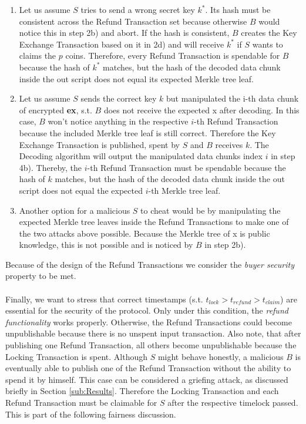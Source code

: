 \documentclass{cacthesis}
\newcounter{protocol}
\begin{document}
        \begin{enumerate}
            \item Let us assume $S$ tries to send a wrong secret key $k^*$. Its hash must be consistent across the Refund Transaction set because otherwise $B$ would notice this in step 2b) and abort. If the hash is consistent, $B$ creates the Key Exchange Transaction based on it in 2d) and will receive $k^*$ if $S$ wants to claims the $p$ coins. Therefore, every Refund Transaction is spendable for $B$ because the hash of $k^*$ matches, but the hash of the decoded data chunk inside the out script does not equal its expected Merkle tree leaf.

            \item Let us assume $S$ sends the correct key $k$ but manipulated the i-th data chunk of encrypted \textsf{\textbf{ex}}, s.t. $B$ does not receive the expected \textsf{x} after decoding. In this case, $B$ won't notice anything in the respective $i$-th Refund Transaction because the included Merkle tree leaf is still correct. Therefore the Key Exchange Transaction is published, spent by $S$ and  $B$ receives $k$.  The \textsf{Decoding} algorithm will output the manipulated data chunks index $i$ in step 4b). Thereby, the $i$-th Refund Transaction must be spendable because the hash of $k$ matches, but the hash of the decoded data chunk inside the out script does not equal the expected $i$-th Merkle tree leaf.

            \item Another option for a malicious $S$ to cheat would be by manipulating the expected Merkle tree leaves inside the Refund Transactions to make one of the two attacks above possible. Because the Merkle tree of \textsf{x} is public knowledge, this is not possible and is noticed by $B$ in step 2b). 
        \end{enumerate}
        Because of the design of the Refund Transactions we consider the \textit{buyer security} property to be met. \\\\
        Finally, we want to stress that correct timestamps (s.t. $t_{lock} > t_{refund} > t_{claim}$) are essential for the security of the protocol. Only under this condition, the \textit{refund functionality} works properly. Otherwise, the Refund Transactions could become unpublishable because there is no unspent input transaction. Also note, that after publishing one Refund Transaction, all others become unpublishable because the Locking Transaction is spent. Although $S$ might behave honestly, a malicious $B$ is eventually able to publish one of the Refund Transaction without the ability to spend it by himself. This case can be considered a griefing attack, as discussed briefly in Section \ref{sub:Results}. Therefore the Locking Transaction and each Refund Transaction must be claimable for $S$ after the respective timelock passed. This is part of the following fairness discussion.
\end{document}
